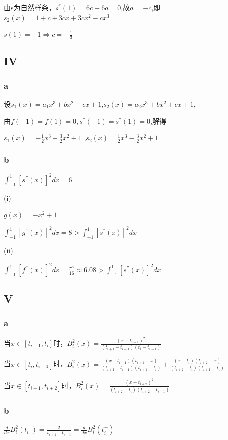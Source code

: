\documentclass[12]{article}%
\begin{document}
            由s为自然样条，$s^{''}(1)=6c+6a=0$,故$a=-c$,即$s_2(x)=1+c+3cx+3cx^2-cx^3$

            $s(1)=-1 \Rightarrow c=-\frac{1}{3}$

        \subsection{IV}
            \subsubsection{a}
                设$s_1(x)=a_1x^3+bx^2+cx+1$,$s_2(x)=a_2x^3+bx^2+cx+1$,

                由$f(-1)=f(1)=0,s^{''}(-1)=s^{''}(1)=0$,解得

                $s_1(x)=-\frac{1}{2}x^3-\frac{3}{2}x^2+1$
                ,$s_2(x)=\frac{1}{2}x^3-\frac{3}{2}x^2+1$
                
            \subsubsection{b}
                $\int_{-1}^{1}[s^{''}(x)]^2dx=6$

                (i)

                $g(x)=-x^2+1$

                $\int_{-1}^1[g^{''}(x)]^2dx=8 > \int_{-1}^{1}[s^{''}(x)]^2dx$

                (ii)

                $\int_{-1}^1[f^{''}(x)]^2dx=\frac{\pi^4}{16} \approx 6.08 > \int_{-1}^{1}[s^{''}(x)]^2dx$

        \subsection{V}
            \subsubsection{a}
            当$x\in[t_{i-1},t_i]$时，$B_i^2(x)=\frac{(x-t_{i-1})^2}{(t_{i+1}-t_{i-1})(t_{i}-t_{i-1})}$

            当$x\in[t_{i},t_{i+1}]$时，$B_i^2(x)=\frac{(x-t_{i-1})(t_{i+1}-x)}{(t_{i+1}-t_{i-1})(t_{i+1}-t_{i})}+\frac{(x-t_{i})(t_{i+2}-x)}{(t_{i+2}-t_{i})(t_{i+1}-t_{i})}$

            当$x\in[t_{i+1},t_{i+2}]$时，$B_i^2(x)=\frac{(x-t_{i+2})^2}{(t_{i+2}-t_{i})(t_{i+2}-t_{i+1})}$

            \subsubsection{b}
            $\frac{d}{dx}B^2_i(t_i^-)=\frac{2}{t_{i+1}-t_{i-1}}=\frac{d}{dx}B^2_i(t_i^+)$
            
\end{document}
